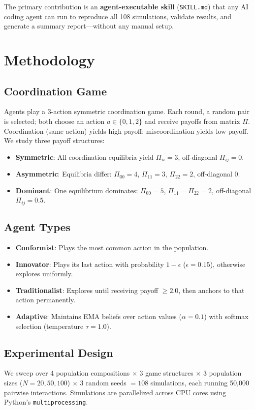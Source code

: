 \documentclass[11pt]{article}
\begin{document}
The primary contribution is an \textbf{agent-executable skill} (\texttt{SKILL.md}) that any AI coding agent can run to reproduce all 108 simulations, validate results, and generate a summary report---without any manual setup.

\section{Methodology}

\subsection{Coordination Game}
Agents play a 3-action symmetric coordination game.
Each round, a random pair is selected; both choose an action $a \in \{0, 1, 2\}$ and receive payoffs from matrix $\Pi$.
Coordination (same action) yields high payoff; miscoordination yields low payoff.
We study three payoff structures:
\begin{itemize}
  \item \textbf{Symmetric}: All coordination equilibria yield $\Pi_{ii} = 3$, off-diagonal $\Pi_{ij} = 0$.
  \item \textbf{Asymmetric}: Equilibria differ: $\Pi_{00} = 4$, $\Pi_{11} = 3$, $\Pi_{22} = 2$, off-diagonal 0.
  \item \textbf{Dominant}: One equilibrium dominates: $\Pi_{00} = 5$, $\Pi_{11} = \Pi_{22} = 2$, off-diagonal $\Pi_{ij} = 0.5$.
\end{itemize}

\subsection{Agent Types}
\begin{itemize}
  \item \textbf{Conformist}: Plays the most common action in the population.
  \item \textbf{Innovator}: Plays its last action with probability $1 - \epsilon$ ($\epsilon = 0.15$), otherwise explores uniformly.
  \item \textbf{Traditionalist}: Explores until receiving payoff $\geq 2.0$, then anchors to that action permanently.
  \item \textbf{Adaptive}: Maintains EMA beliefs over action values ($\alpha = 0.1$) with softmax selection (temperature $\tau = 1.0$).
\end{itemize}

\subsection{Experimental Design}
We sweep over 4 population compositions $\times$ 3 game structures $\times$ 3 population sizes ($N = 20, 50, 100$) $\times$ 3 random seeds $= 108$ simulations, each running 50,000 pairwise interactions.
Simulations are parallelized across CPU cores using Python's \texttt{multiprocessing}.
\end{document}
